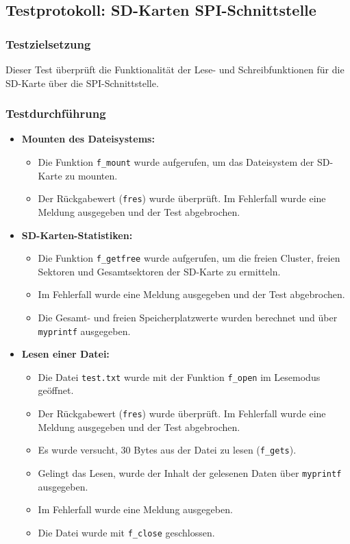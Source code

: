 \subsection{Testprotokoll: SD-Karten SPI-Schnittstelle}

\subsubsection{Testzielsetzung}
Dieser Test überprüft die Funktionalität der Lese- und Schreibfunktionen für die SD-Karte über die SPI-Schnittstelle.

\subsubsection{Testdurchführung}

\begin{itemize}
	\item \textbf{Mounten des Dateisystems:}
	\begin{itemize}
		\item Die Funktion \texttt{f\_mount} wurde aufgerufen, um das Dateisystem der SD-Karte zu mounten.
		\item Der Rückgabewert (\texttt{fres}) wurde überprüft. Im Fehlerfall wurde eine Meldung ausgegeben und der Test abgebrochen.
	\end{itemize}
	
	\item \textbf{SD-Karten-Statistiken:}
	\begin{itemize}
		\item Die Funktion \texttt{f\_getfree} wurde aufgerufen, um die freien Cluster, freien Sektoren und Gesamtsektoren der SD-Karte zu ermitteln.
		\item Im Fehlerfall wurde eine Meldung ausgegeben und der Test abgebrochen.
		\item Die Gesamt- und freien Speicherplatzwerte wurden berechnet und über \texttt{myprintf} ausgegeben.
	\end{itemize}
	
	\item \textbf{Lesen einer Datei:}
	\begin{itemize}
		\item Die Datei \texttt{test.txt} wurde mit der Funktion \texttt{f\_open} im Lesemodus geöffnet.
		\item Der Rückgabewert (\texttt{fres}) wurde überprüft. Im Fehlerfall wurde eine Meldung ausgegeben und der Test abgebrochen.
		\item Es wurde versucht, 30 Bytes aus der Datei zu lesen (\texttt{f\_gets}).
		\item Gelingt das Lesen, wurde der Inhalt der gelesenen Daten über \texttt{myprintf} ausgegeben.
		\item Im Fehlerfall wurde eine Meldung ausgegeben.
		\item Die Datei wurde mit \texttt{f\_close} geschlossen.
	\end{itemize}
	

\end{itemize}
